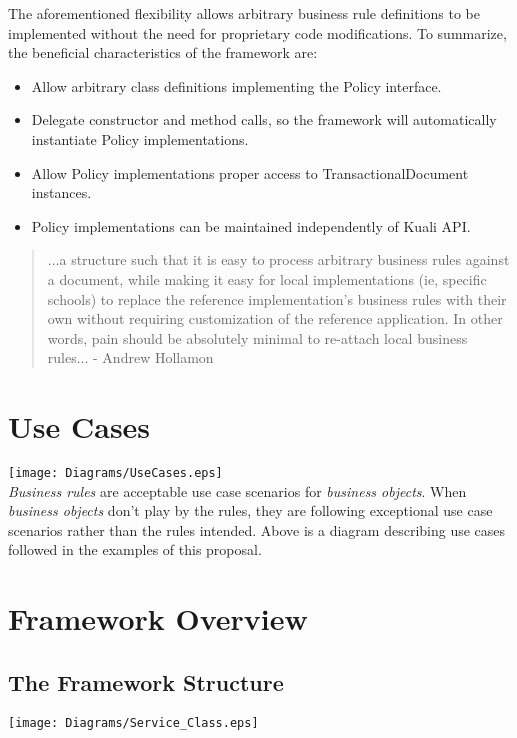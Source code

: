 \documentclass[12pt]{article}
\begin{document}
The aforementioned flexibility allows arbitrary business rule definitions 
to be implemented without the need for proprietary code modifications. To
summarize, the beneficial characteristics of the framework are:
\begin{itemize}
  \item Allow arbitrary class definitions implementing the 
  \sf Policy \rm interface.
  \item Delegate constructor and method calls, so the framework will 
  automatically instantiate \sf Policy \rm implementations.
  \item Allow \sf Policy \rm implementations proper access to 
  \sf TransactionalDocument \rm instances.
  \item \sf Policy \rm implementations can be maintained independently of
  Kuali API.
\end{itemize}
\begin{quote}
...a structure such
that it is easy to process arbitrary business rules against a document,
while making it easy for local implementations (ie, specific schools) to
replace the reference implementation's business rules with their own
without requiring customization of the reference application.  In other
words, pain should be absolutely minimal to re-attach local business
rules...  - Andrew Hollamon
\end{quote}

  \section{Use Cases}
  \texttt{[image: Diagrams/UseCases.eps]}  \\

\emph{Business rules} are acceptable use case scenarios for
\emph{business objects}. When \emph{business objects} don't play by the rules,
they are following exceptional use case scenarios rather than the rules
intended. Above is a diagram describing use cases followed in the examples
of this proposal. 

  \section{Framework Overview}
  \subsection{The Framework Structure}
  \texttt{[image: Diagrams/Service\_Class.eps]} \\
\end{document}
